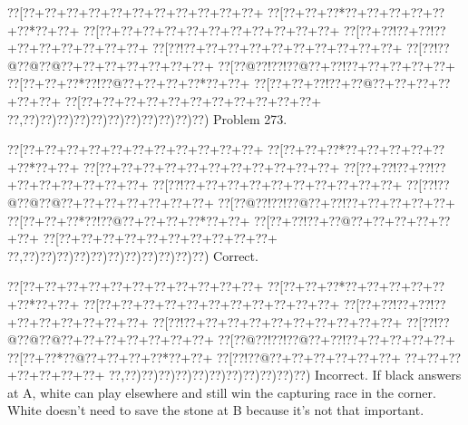 \documentclass[a5paper]{article}
\begin{document}
\newpage
\begin{center}
{\goo
\0??[\0??+\0??+\0??+\0??+\0??+\0??+\0??+\0??+\0??+\0??+\0??+
\0??[\0??+\0??+\0??*\0??+\0??+\0??+\0??+\0??+\0??*\0??+\0??+
\0??[\0??+\0??+\0??+\0??+\0??+\0??+\0??+\0??+\0??+\0??+\0??+
\0??[\0??+\0??!\0??+\0??!\0??+\0??+\0??+\0??+\0??+\0??+\0??+
\0??[\0??!\0??+\0??+\0??+\0??+\0??+\0??+\0??+\0??+\0??+\0??+
\0??[\0??!\0??@\0??@\0??@\0??+\0??+\0??+\0??+\0??+\0??+\0??+
\0??[\0??@\0??!\0??!\0??@\0??+\0??!\0??+\0??+\0??+\0??+\0??+
\0??[\0??+\0??+\0??*\0??!\0??@\0??+\0??+\0??+\0??*\0??+\0??+
\0??[\0??+\0??+\0??!\0??+\0??@\0??+\0??+\0??+\0??+\0??+\0??+
\0??[\0??+\0??+\0??+\0??+\0??+\0??+\0??+\0??+\0??+\0??+\0??+
\0??,\0??)\0??)\0??)\0??)\0??)\0??)\0??)\0??)\0??)\0??)\0??)
}
Problem 273.

\end{center}
\begin{center}
{\goo
\0??[\0??+\0??+\0??+\0??+\0??+\0??+\0??+\0??+\0??+\0??+\0??+
\0??[\0??+\0??+\0??*\0??+\0??+\0??+\0??+\0??+\0??*\0??+\0??+
\0??[\0??+\0??+\0??+\0??+\0??+\0??+\0??+\0??+\0??+\0??+\0??+
\0??[\0??+\0??!\0??+\0??!\0??+\0??+\0??+\0??+\0??+\0??+\0??+
\0??[\0??!\0??+\0??+\0??+\0??+\0??+\0??+\0??+\0??+\0??+\0??+
\0??[\0??!\0??@\0??@\0??@\0??+\0??+\0??+\0??+\0??+\0??+\0??+
\0??[\0??@\0??!\0??!\0??@\0??+\0??!\0??+\0??+\0??+\0??+\0??+
\0??[\0??+\0??+\0??*\0??!\0??@\0??+\0??+\0??+\0??*\0??+\0??+
\0??[\0??+\0??!\0??+\0??@\0??+\0??+\0??+\0??+\0??+\0??+
\0??[\0??+\0??+\0??+\0??+\0??+\0??+\0??+\0??+\0??+\0??+
\0??,\0??)\0??)\0??)\0??)\0??)\0??)\0??)\0??)\0??)\0??)\0??)
}
Correct. 

\end{center}
\begin{center}
{\goo
\0??[\0??+\0??+\0??+\0??+\0??+\0??+\0??+\0??+\0??+\0??+\0??+
\0??[\0??+\0??+\0??*\0??+\0??+\0??+\0??+\0??+\0??*\0??+\0??+
\0??[\0??+\0??+\0??+\0??+\0??+\0??+\0??+\0??+\0??+\0??+\0??+
\0??[\0??+\0??!\0??+\0??!\0??+\0??+\0??+\0??+\0??+\0??+\0??+
\0??[\0??!\0??+\0??+\0??+\0??+\0??+\0??+\0??+\0??+\0??+\0??+
\0??[\0??!\0??@\0??@\0??@\0??+\0??+\0??+\0??+\0??+\0??+\0??+
\0??[\0??@\0??!\0??!\0??@\0??+\0??!\0??+\0??+\0??+\0??+\0??+
\0??[\0??+\0??*\0??@\0??+\0??+\0??+\0??*\0??+\0??+
\0??[\0??!\0??@\0??+\0??+\0??+\0??+\0??+\0??+
\0??+\0??+\0??+\0??+\0??+\0??+\0??+
\0??,\0??)\0??)\0??)\0??)\0??)\0??)\0??)\0??)\0??)\0??)\0??)
}
Incorrect. If black answers at A, white can play elsewhere and still win the capturing race in the corner. White doesn't need to save the stone at B because it's not that important.

\end{center}
\end{document}
